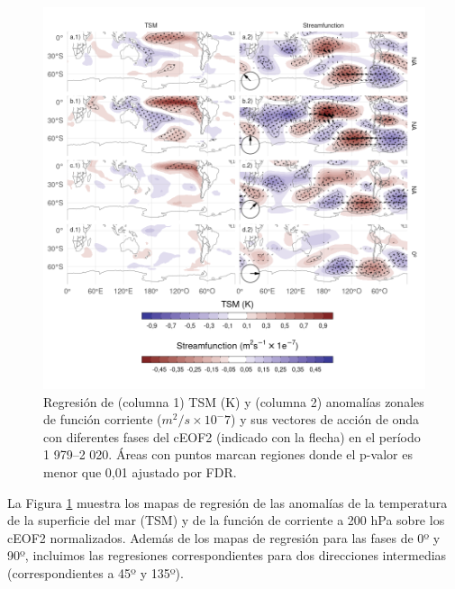 \documentclass[12pt,oneside,a4paper]{reedthesis}
\begin{document}
\begin{figure}

{\centering \includegraphics{figures/20-ceofs/sst-psi-2-1} 

}

\caption{Regresión de (columna 1) TSM (K) y (columna 2) anomalías zonales de función corriente (\(m^2/s\times10^-7\)) y sus vectores de acción de onda con diferentes fases del cEOF2 (indicado con la flecha) en el período 1 979--2 020. Áreas con puntos marcan regiones donde el p-valor es menor que 0,01 ajustado por FDR.}\label{fig:sst-psi-2}
\end{figure}

La Figura \ref{fig:sst-psi-2} muestra los mapas de regresión de las anomalías de la temperatura de la superficie del mar (TSM) y de la función de corriente a 200 hPa sobre los cEOF2 normalizados.
Además de los mapas de regresión para las fases de 0º y 90º, incluimos las regresiones correspondientes para dos direcciones intermedias (correspondientes a 45º y 135º).
\end{document}
